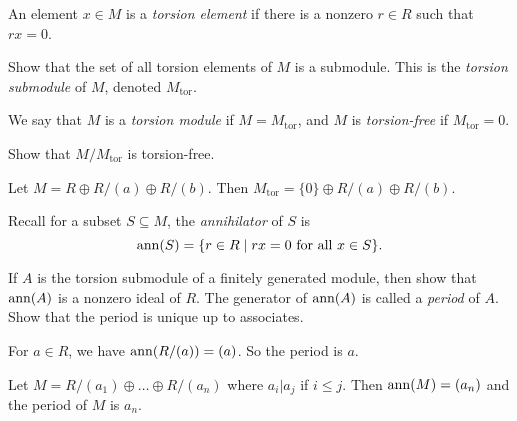 \begin{definition}
  An element $x \in M$ is a \emph{torsion element} if
  there is a nonzero $r \in R$ such that $rx = 0$.
\end{definition}

\begin{exercise}
  Show that the set of all torsion elements of $M$ is a
  submodule. This is the \emph{torsion submodule} of $M$,
  denoted $M_{\mathrm{tor}}$.
\end{exercise}

\begin{definition}
  We say that $M$ is a \emph{torsion module} if
  $M = M_{\mathrm{tor}}$, and $M$ is \emph{torsion-free}
  if $M_{\mathrm{tor}} = 0$.
\end{definition}

\begin{exercise}
  Show that $M / M_{\mathrm{tor}}$ is torsion-free.
\end{exercise}

\begin{example}
  Let $M = R \oplus R / (a) \oplus R / (b)$. Then
  $M_{\mathrm{tor}} = \{0\} \oplus R / (a) \oplus R / (b)$.
\end{example}

\begin{remark}
  Recall for a subset $S \subseteq M$, the \emph{annihilator}
  of $S$ is
  \[
    \operatorname{ann}(S) = \{r \in R \mid rx = 0 \text{ for all } x \in S\}.
  \]
\end{remark}

\begin{exercise}
  If $A$ is the torsion submodule of a finitely generated
  module, then show that $\operatorname{ann}(A)$ is a nonzero ideal of $R$. The generator of $\operatorname{ann}(A)$ is called a \emph{period}
  of $A$. Show that the period is unique up to
  associates.
\end{exercise}

\begin{example}
  For $a \in R$, we have $\operatorname{ann}(R / (a)) = (a)$. So the
  period is $a$.
\end{example}

\begin{example}
  Let $M = R / (a_1) \oplus \dots \oplus R / (a_n)$
  where $a_i | a_j$ if $i \le j$. Then
  $\operatorname{ann}(M) = (a_n)$ and the period of $M$ is $a_n$.
\end{example}

